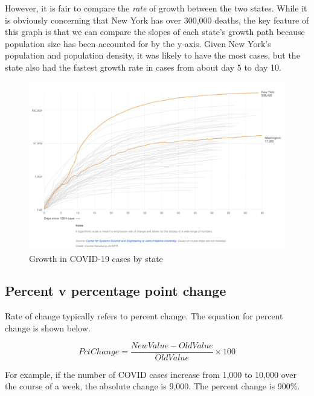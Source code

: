 \documentclass[
]{book}
\begin{document}
However, it is fair to compare the \emph{rate} of growth between the two states. While it is obviously concerning that New York has over 300,000 deaths, the key feature of this graph is that we can compare the slopes of each state's growth path because population size has been accounted for by the y-axis. Given New York's population and population density, it was likely to have the most cases, but the state also had the fastest growth rate in cases from about day 5 to day 10.

\begin{figure}

{\centering \includegraphics[width=\textwidth]{images/logs_covid} 

}

\caption{Growth in COVID-19 cases by state}\label{fig:logcovid}
\end{figure}

\hypertarget{percent-v-percentage-point-change}{%
\subsection{Percent v percentage point change}\label{percent-v-percentage-point-change}}

Rate of change typically refers to percent change. The equation for percent change is shown below.

\begin{equation}
PctChange = {\frac{NewValue-OldValue}{OldValue}} \times 100
\label{eq:pctchange}
\end{equation}

For example, if the number of COVID cases increase from 1,000 to 10,000 over the course of a week, the absolute change is 9,000. The percent change is 900\%.
\end{document}
